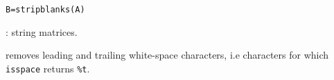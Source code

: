 
\begin{mandesc}
\end{mandesc}
\begin{calling_sequence}
\begin{verbatim}
B=stripblanks(A)
\end{verbatim}
\end{calling_sequence}

\begin{parameters}
  \begin{varlist}
    : string matrices.
  \end{varlist}
\end{parameters}

\begin{mandescription}
removes leading and trailing white-space characters, i.e characters for which 
\verb+isspace+ returns \verb+%t+.
\end{mandescription}

